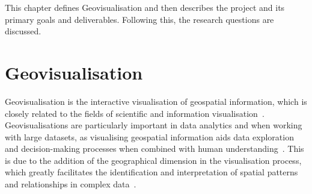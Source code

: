 
This chapter defines Geovisualisation and then describes the project and its primary goals and deliverables. Following this, the research questions are discussed.

\section{Geovisualisation} {
\label{sec:geovisualisation}

	Geovisualisation is the interactive visualisation of geospatial information, which is closely related to the fields of scientific and information visualisation~\parencite{jiang2005geovisualization}. Geovisualisations are particularly important in data analytics and when working with large datasets, as visualising geospatial information aids data exploration and decision-making processes when combined with human understanding~\parencite{grinstein2002introduction, hendley1995case}. This is due to the addition of the geographical dimension in the visualisation process, which greatly facilitates the identification and interpretation of spatial patterns and relationships in complex data~\parencite{kwan2004geovisualization}.


}

